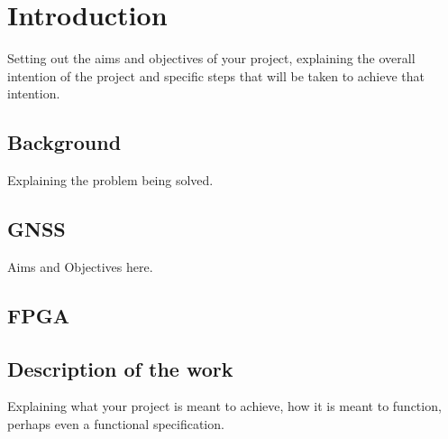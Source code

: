 \chapter{Introduction}

Setting out the aims and objectives of your project, explaining the overall intention of the project and specific steps that will be taken to achieve that intention.

\section{Background}

Explaining the problem being solved.


\section{GNSS}

Aims and Objectives here.

\section{FPGA}


\section{Description of the work}

Explaining what your project is meant to achieve, how it is meant to function, perhaps even a functional specification.



